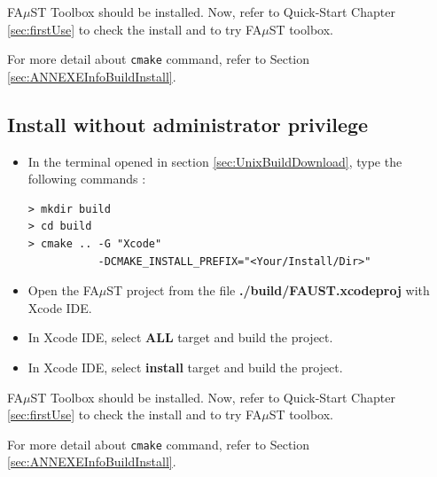 FA$\mu$ST Toolbox should be installed. Now, refer to Quick-Start Chapter \ref{sec:firstUse} to check the install and to try FA$\mu$ST toolbox.

For more detail about \texttt{cmake} command, refer to Section \ref{sec:ANNEXEInfoBuildInstall}.


\subsection{Install without administrator privilege}\label{sec:XcodeUnixBuildInstallNOAdmin}
 
\begin{itemize}

\item In the terminal opened in section 
\ref{sec:UnixBuildDownload}, type the following commands : 
\lstset{style=customBash}
\begin{lstlisting}
> mkdir build
> cd build
> cmake .. -G "Xcode" 
		   -DCMAKE_INSTALL_PREFIX="<Your/Install/Dir>"
\end{lstlisting}

\item Open the FA$\mu$ST project from the file \textbf{./build/FAUST.xcodeproj} with Xcode IDE. 
\item In Xcode IDE, select \textbf{ALL} target and build the project. 
\item In Xcode IDE, select \textbf{install} target and build the project. 
\end{itemize}

FA$\mu$ST Toolbox should be installed. Now, refer to Quick-Start Chapter \ref{sec:firstUse} to check the install and to try FA$\mu$ST toolbox.

For more detail about \texttt{cmake} command, refer to Section \ref{sec:ANNEXEInfoBuildInstall}.



